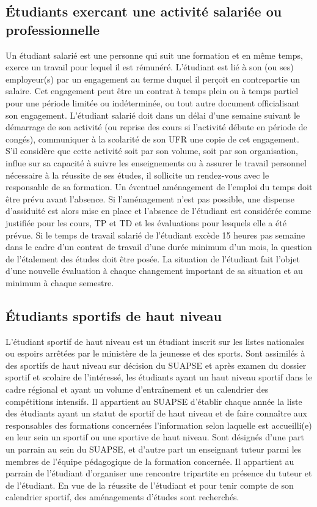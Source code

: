 \documentclass[a4paper,11pt]{article}
\begin{document}
\subsection{Étudiants exercant une activité salariée ou professionnelle}\label{Salarie}
Un étudiant salarié est une personne qui suit une formation et en même temps, exerce un travail pour lequel il est rémunéré. L'étudiant est lié à son (ou ses) employeur(s) par un engagement au terme duquel il perçoit en contrepartie un salaire. Cet engagement peut être un contrat à temps plein ou à temps partiel pour une période limitée ou indéterminée, ou tout autre document officialisant son engagement.
L'étudiant salarié doit dans un délai d'une semaine suivant le démarrage de son activité (ou reprise des cours si l'activité débute en période de congés), communiquer à la scolarité de son UFR une copie de cet engagement. S'il considère que cette activité soit par son volume, soit par son organisation, influe sur sa capacité à suivre les enseignements ou à assurer le travail personnel nécessaire à la réussite de ses études, il sollicite un rendez-vous avec le responsable de sa formation.
Un éventuel aménagement de l'emploi du temps doit être prévu avant l'absence. Si l'aménagement n'est pas possible, une dispense d'assiduité est alors mise en place et l'absence de l'étudiant est considérée comme justifiée pour les cours, TP et TD et les évaluations pour lesquels elle a été prévue.
Si le temps de travail salarié de l'étudiant excède 15 heures pas semaine dans le cadre d'un contrat de travail d'une durée minimum d'un mois, la question de l'étalement des études doit être posée.
La situation de l'étudiant fait l'objet d'une nouvelle évaluation à chaque changement important de sa situation et au minimum à chaque semestre.

\subsection{Étudiants sportifs de haut niveau}\label{Sportif}
L'étudiant sportif de haut niveau est un étudiant inscrit sur les listes nationales ou espoirs arrêtées par le ministère de la jeunesse et des sports. Sont assimilés à des sportifs de haut niveau sur décision du SUAPSE et après examen du dossier sportif et scolaire de l'intéressé, les étudiants ayant un haut niveau sportif dans le cadre régional et ayant un volume d'entraînement et un calendrier des compétitions intensifs.
Il appartient au SUAPSE d'établir chaque année la liste des étudiants ayant un statut de sportif de haut niveau et de faire connaître aux responsables des formations concernées l'information selon laquelle est accueilli(e) en leur sein un sportif ou une sportive de haut niveau.
Sont désignés d'une part un parrain au sein du SUAPSE, et d'autre part un enseignant tuteur parmi les membres de l'équipe pédagogique de la formation concernée. Il appartient au parrain de l'étudiant d'organiser une rencontre tripartite en présence du tuteur et de l'étudiant.
En vue de la réussite de l'étudiant et pour tenir compte de son calendrier sportif, des aménagements d'études sont recherchés.
\end{document}
